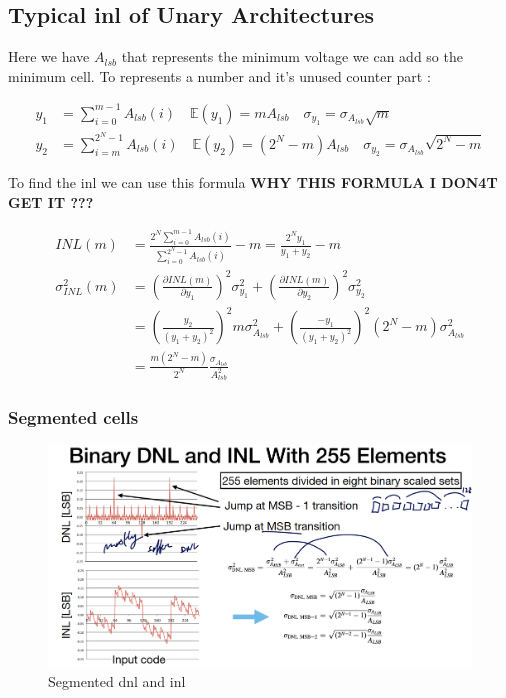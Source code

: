 \documentclass{report}
\begin{document}
\subsection{Typical \gls{inl} of Unary Architectures}

Here we have $A_{lsb}$ that represents the minimum voltage we can add so the minimum cell. To represents a number and it's unused counter part : 

\begin{align}
    y_1 &= \sum_{i=0}^{m-1} A_{lsb}(i) \quad \mathbb{E}(y_1) = m A_{lsb} \quad \sigma_{y_1} = \sigma_{A_{lsb}} \sqrt{m}\\
    y_2 &= \sum_{i=m}^{2^N-1} A_{lsb}(i) \quad \mathbb{E}(y_2) = (2^N-m) A_{lsb} \quad \sigma_{y_2} = \sigma_{A_{lsb}} \sqrt{2^N -m}
\end{align}

To find the \gls{inl} we can use this formula \textbf{WHY THIS FORMULA I DON4T GET IT ???}

\begin{align}
    INL(m) &= \frac{2^N \sum_{i=0}^{m-1} A_{lsb}(i) }{\sum_{i=0}^{2^N - 1} A_{lsb}(i) } - m = \frac{2^N y_1}{y_1 + y_2}  - m\\
    \sigma_{INL}^2(m) &= \left(\frac{\partial INL(m)}{\partial y_1} \right)^2 \sigma_{y_1}^2 + \left(\frac{\partial INL(m)}{\partial y_2} \right)^2 \sigma_{y_2}^2\\
    &= \left( \frac{y_2}{(y_1+y_2)^2} \right)^2 m \sigma_{A_{lsb}}^2 + \left( \frac{-y_1}{(y_1+y_2)^2} \right)^2 (2^N-m) \sigma_{A_{lsb}}^2\\
    &= \frac{m(2^N - m)}{2^N} \frac{\sigma_{A_{lsb}}}{A_{lsb}^2}
\end{align}

\subsubsection{Segmented cells}

\begin{figure}[H]
    \centering
    \includegraphics[width=0.75\linewidth]{img/segmented_DNL_INL.png}
    \caption{Segmented \gls{dnl} and \gls{inl}}
    \label{fig:segmented-cell-label}
\end{figure}
\end{document}

